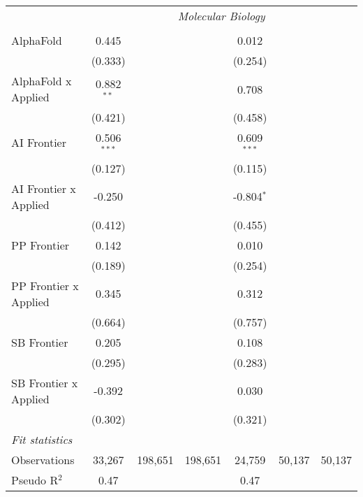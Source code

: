 \begin{tabular}{lcccccc}
 & \multicolumn{6}{c}{\textit{Molecular Biology}} \\ \\
   AlphaFold             & 0.445         &         &         & 0.012         &        &   \\   
                         & (0.333)       &         &         & (0.254)       &        &   \\   
   AlphaFold x Applied   & 0.882$^{**}$  &         &         & 0.708         &        &   \\   
                         & (0.421)       &         &         & (0.458)       &        &   \\   
   AI Frontier           & 0.506$^{***}$ &         &         & 0.609$^{***}$ &        &   \\   
                         & (0.127)       &         &         & (0.115)       &        &   \\   
   AI Frontier x Applied & -0.250        &         &         & -0.804$^{*}$  &        &   \\   
                         & (0.412)       &         &         & (0.455)       &        &   \\   
   PP Frontier           & 0.142         &         &         & 0.010         &        &   \\   
                         & (0.189)       &         &         & (0.254)       &        &   \\   
   PP Frontier x Applied & 0.345         &         &         & 0.312         &        &   \\   
                         & (0.664)       &         &         & (0.757)       &        &   \\   
   SB Frontier           & 0.205         &         &         & 0.108         &        &   \\   
                         & (0.295)       &         &         & (0.283)       &        &   \\   
   SB Frontier x Applied & -0.392        &         &         & 0.030         &        &   \\   
                         & (0.302)       &         &         & (0.321)       &        &   \\   
   \midrule
   \emph{Fit statistics}\\
   Observations          & 33,267        & 198,651 & 198,651 & 24,759        & 50,137 & 50,137\\  
   Pseudo R$^2$          & 0.47          &         &         & 0.47          &        & \\  
   

\end{tabular}
